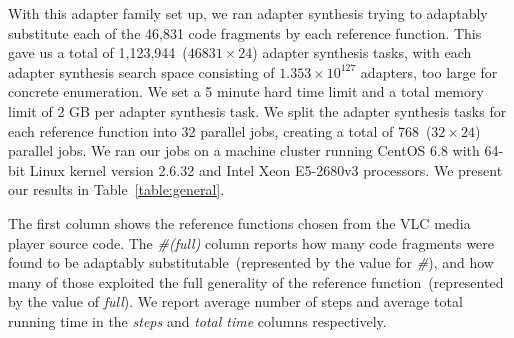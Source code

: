 With this adapter family set up, we ran adapter synthesis trying to adaptably substitute each of the 46,831 code fragments by each reference function.
%
This gave us a total of 1,123,944~($46831 \times 24$) adapter synthesis tasks, with each adapter synthesis search space consisting of $1.353 \times 10^{127}$ adapters, too large for concrete enumeration.
%
%
We set a 5 minute hard time limit and a total memory limit of 2 GB per adapter synthesis task.
%
We split the adapter synthesis tasks for each reference function into 32 parallel jobs, creating a total of 768~($32 \times 24$) parallel jobs.
%
We ran our jobs on a machine cluster running CentOS 6.8 with 64-bit Linux kernel version 2.6.32 and Intel Xeon E5-2680v3 processors.
%
We present our results in Table~\ref{table:general}.
%
%
%
%

The first column shows the reference functions chosen from the VLC media player source code.
%
The \textit{\#(full)} column reports how many code fragments were found to be adaptably substitutable~(represented by the value for \textit{\#}), and how many of those exploited the full generality of the reference function~(represented by the value of \textit{full}).
%
We report average number of steps and average total running time in the \textit{steps} and \textit{total time} columns respectively.
%
